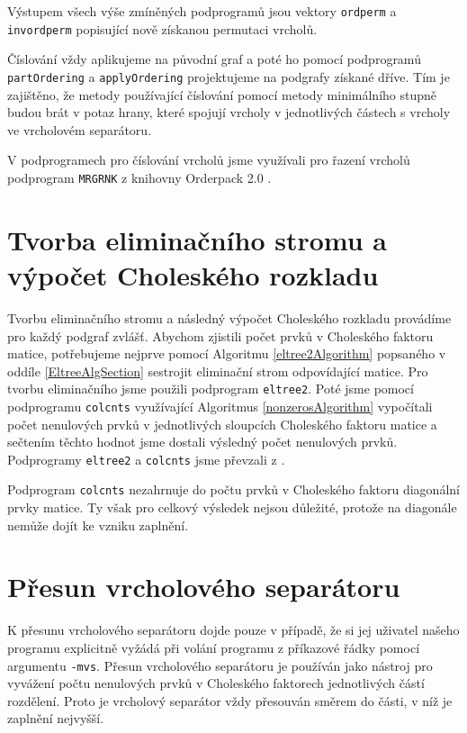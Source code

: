 \documentclass[11pt,american,czech,oneside]{book}
\theoremstyle{plain}
\theoremstyle{definition}
\begin{document}
Výstupem všech výše zmíněných podprogramů jsou vektory \texttt{ordperm} a \texttt{invordperm} popisující nově získanou permutaci vrcholů.

Číslování vždy aplikujeme na původní graf a poté ho pomocí podprogramů \texttt{partOrdering} a \texttt{applyOrdering} projektujeme na podgrafy získané dříve. Tím je zajištěno, že metody používající číslování pomocí metody minimálního stupně budou brát v potaz hrany, které spojují vrcholy v jednotlivých částech s vrcholy ve vrcholovém separátoru.

V podprogramech pro číslování vrcholů jsme využívali pro řazení vrcholů podprogram \texttt{MRGRNK} z knihovny Orderpack 2.0 \cite{orderpack}.

\section{Tvorba eliminačního stromu a výpočet Choleského rozkladu}
Tvorbu eliminačního stromu a následný výpočet Choleského rozkladu provádíme pro každý podgraf zvlášť. Abychom zjistili počet prvků v Choleského faktoru matice, potřebujeme nejprve pomocí Algoritmu \ref{eltree2Algorithm} popsaného v oddíle \ref{EltreeAlgSection} sestrojit eliminační strom odpovídající matice. Pro tvorbu eliminačního jsme použili podprogram \texttt{eltree2}. Poté jsme pomocí podprogramu \texttt{colcnts}  využívající Algoritmus \ref{nonzerosAlgorithm} vypočítali počet nenulových prvků v jednotlivých sloupcích Choleského faktoru matice a sečtením těchto hodnot jsme dostali výsledný počet nenulových prvků. Podprogramy \texttt{eltree2} a \texttt{colcnts} jsme převzali z \cite{lapack}.

Podprogram \texttt{colcnts} nezahrnuje do počtu prvků v Choleského faktoru diagonální prvky matice. Ty však pro celkový výsledek nejsou důležité, protože na diagonále nemůže dojít ke vzniku zaplnění.

\section{Přesun vrcholového separátoru}
K přesunu vrcholového separátoru dojde pouze v případě, že si jej uživatel našeho programu explicitně vyžádá při volání programu z příkazové řádky pomocí argumentu \texttt{-mvs}. Přesun vrcholového separátoru je používán jako nástroj pro vyvážení počtu nenulových prvků v Choleského faktorech jednotlivých částí rozdělení. Proto je vrcholový separátor vždy přesouván směrem do části, v níž je zaplnění nejvyšší.
\end{document}
